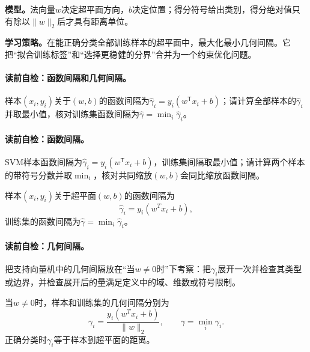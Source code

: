 \label{struct:V3-C02-CH08}
\textbf{模型。}法向量$w$决定超平面方向，$b$决定位置；得分符号给出类别，得分绝对值只有除以$\lVert w\rVert_2$后才具有距离单位。

\label{struct:V3-C02-CH09}
\textbf{学习策略。}在能正确分类全部训练样本的超平面中，最大化最小几何间隔。它把“拟合训练标签”和“选择更稳健的分界”合并为一个约束优化问题。


\paragraph{读前自检：函数间隔和几何间隔。}样本$(x_i,y_i)$关于$(w,b)$的函数间隔为$\widehat\gamma_i=y_i(w^{\mathsf T}x_i+b)$；请计算全部样本的$\widehat\gamma_i$并取最小值，核对训练集函数间隔为$\widehat\gamma=\min_i\widehat\gamma_i$。\par
\paragraph{读前自检：函数间隔。}SVM样本函数间隔为$\widehat\gamma_i=y_i(w^{\mathsf T}x_i+b)$，训练集间隔取最小值；请计算两个样本的带符号分数并取$\min_i$，核对共同缩放$(w,b)$会同比缩放函数间隔。\par

\begin{definition}[函数间隔]\label{def:V3-C02-functional-margin}
样本$(x_i,y_i)$关于超平面$(w,b)$的函数间隔为
\[
\widehat\gamma_i=y_i(w^Tx_i+b),
\]
训练集的函数间隔为$\widehat\gamma=\min_i\widehat\gamma_i$。
\end{definition}

\paragraph{读前自检：几何间隔。}把支持向量机中的几何间隔放在“当$w\neq0$时”下考察：把$\gamma_i$展开一次并检查其类型或边界，并检查展开后的量满足定义中的域、维数或符号限制。\par

\begin{definition}[几何间隔]\label{def:V3-C02-geometric-margin}
当$w\neq0$时，样本和训练集的几何间隔分别为
\[
\gamma_i=\frac{y_i(w^Tx_i+b)}{\lVert w\rVert_2},
\qquad
\gamma=\min_i\gamma_i.
\]
正确分类时$\gamma_i$等于样本到超平面的距离。
\end{definition}

